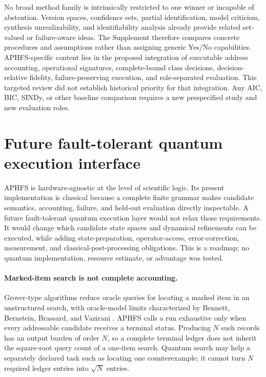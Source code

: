 \documentclass[10pt]{article}
\theoremstyle{definition}
\begin{document}
No broad method family is intrinsically restricted to one winner or incapable of abstention.
Version spaces, confidence sets, partial identification, model criticism, synthesis
unrealizability, and identifiability analysis already provide related set-valued or failure-aware
ideas. The Supplement therefore compares concrete procedures and assumptions rather than assigning
generic Yes/No capabilities. APHFS-specific content lies in the proposed integration of executable
address accounting, operational signatures, complete-bound class decisions, decision-relative
fidelity, failure-preserving execution, and role-separated evaluation. This targeted review did
not establish historical priority for that integration. Any AIC, BIC, SINDy, or other baseline comparison requires
a new prespecified study and new evaluation roles.

\section{Future fault-tolerant quantum execution interface}
\label{sec:quantum-interface}

APHFS is hardware-agnostic at the level of scientific logic. Its present implementation is
classical because a complete finite grammar makes candidate semantics, accounting, failure, and
held-out evaluation directly inspectable. A future fault-tolerant quantum execution layer would
not relax those requirements. It would change which candidate state spaces and dynamical
refinements can be executed, while adding state-preparation, operator-access, error-correction,
measurement, and classical-post-processing obligations. This is a roadmap; no quantum
implementation, resource estimate, or advantage was tested.

\paragraph{Marked-item search is not complete accounting.}
Grover-type algorithms reduce oracle queries for locating a marked item in an unstructured search,
with oracle-model limits characterized by Bennett, Bernstein, Brassard, and Vazirani
\citep{grover1996,bbbv1997}. APHFS calls a run exhaustive only when every addressable candidate
receives a terminal status. Producing \(N\) such records has an output burden of order \(N\), so a
complete terminal ledger does not inherit the square-root query count of a one-item search.
Quantum search may help a separately declared task such as locating one counterexample; it cannot
turn \(N\) required ledger entries into \(\sqrt{N}\) entries.
\end{document}

